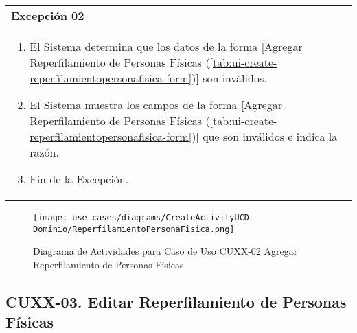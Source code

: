 	\begin{tabular}{ p{15.5cm} }
		\textbf{Excepci\'on 02} \\
		\begin{enumerate}
			\item El Sistema determina que los datos de la forma [Agregar Reperfilamiento de Personas F\'isicas (\ref{tab:ui-create-reperfilamientopersonafisica-form})] son inv\'alidos.
			\item El Sistema muestra los campos de la forma [Agregar Reperfilamiento de Personas F\'isicas (\ref{tab:ui-create-reperfilamientopersonafisica-form})] que son inv\'alidos e indica la raz\'on.
			\item Fin de la Excepci\'on.
		\end{enumerate}
	\end{tabular}
	
	\begin{figure}[H]
		\begin{center}
			\label{tab:activity-create-ucd-entity-reperfilamientopersonafisica}
			\texttt{[image: use-cases/diagrams/CreateActivityUCD-Dominio/ReperfilamientoPersonaFisica.png]}
			\caption{Diagrama de Actividades para Caso de Uso CUXX-02 Agregar Reperfilamiento de Personas F\'isicas}	
	    \end{center}
	\end{figure}
			
	
	\clearpage
	\subsection{CUXX-03. Editar Reperfilamiento de Personas F\'isicas} \label{sec:cu-update-ReperfilamientoPersonaFisica}
	
